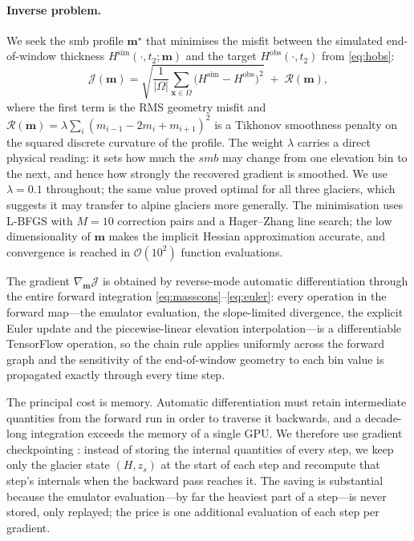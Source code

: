 \paragraph{Inverse problem.}
We seek the smb profile $\mathbf{m}^\star$ that minimises the misfit between the
simulated end-of-window thickness $H^{\mathrm{sim}}(\cdot, t_2; \mathbf{m})$ and the
target $H^{\mathrm{obs}}(\cdot, t_2)$ from \eqref{eq:hobs}:
\begin{equation}
  \mathcal{J}(\mathbf{m}) =
  \sqrt{\frac{1}{|\Omega|}\sum_{\mathbf{x}\in\Omega}
    \big(H^{\mathrm{sim}} - H^{\mathrm{obs}}\big)^2}
  \;+\; \mathcal{R}(\mathbf{m}),
  \label{eq:cost}
\end{equation}
where the first term is the RMS geometry misfit and
$\mathcal{R}(\mathbf{m}) = \lambda \sum_i (m_{i-1} - 2m_i + m_{i+1})^2$ is a
Tikhonov smoothness penalty on the squared discrete curvature of the profile.
The weight $\lambda$ carries a direct physical reading: it sets how much the $smb$ may
change from one elevation bin to the next, and hence how strongly the recovered
gradient is smoothed. We use $\lambda = 0.1$ throughout; the same value proved
optimal for all three glaciers, which suggests it may transfer to alpine glaciers
more generally. The minimisation uses
L-BFGS \citep{liunocedal1989} with $M = 10$ correction pairs and a Hager--Zhang line
search; the low dimensionality of $\mathbf{m}$ makes the implicit Hessian
approximation accurate, and convergence is reached in $\mathcal{O}(10^2)$ function
evaluations.

The gradient
$\nabla_{\mathbf{m}}\mathcal{J}$ is obtained by reverse-mode automatic
differentiation \citep{baydin2018} through the entire forward integration
\eqref{eq:masscons}--\eqref{eq:euler}: every operation in the forward map---the
emulator evaluation, the slope-limited divergence, the explicit Euler update and
the piecewise-linear elevation interpolation---is a differentiable TensorFlow
\citep{abadi2016} operation, so the chain rule applies uniformly across the forward
graph and the sensitivity of the end-of-window geometry to each bin value is
propagated exactly through every time step.

The principal cost is memory. Automatic differentiation must retain intermediate
quantities from the forward run in order to traverse it backwards, and a decade-long
integration exceeds the memory of a single GPU. We therefore use gradient
checkpointing \citep{griewank2000, chen2016}: instead of storing the internal
quantities of every step, we keep only the glacier state $(H, z_s)$ at the start of
each step and recompute that step's internals when the backward pass reaches it. The
saving is substantial because the emulator evaluation---by far the heaviest part of a
step---is never stored, only replayed; the price is one additional evaluation of each
step per gradient.
